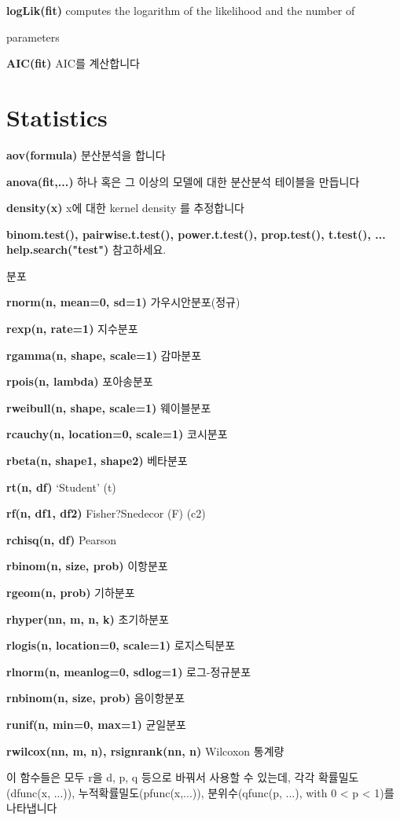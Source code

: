 \documentclass[landscape,twocolumn,letterpaper]{article}
\begin{document}
\textbf{logLik(fit)} computes the logarithm of the likelihood and the number of

parameters

\textbf{AIC(fit)} AIC를 계산합니다

\section{Statistics}

\textbf{aov(formula)} 분산분석을 합니다

\textbf{anova(fit,...) }하나 혹은 그 이상의 모델에 대한 분산분석 테이블을 만듭니다

\textbf{density(x)} x에 대한 kernel density 를 추정합니다

\textbf{binom.test(), pairwise.t.test(), power.t.test(), prop.test(),
t.test(), ... help.search("test")} 참고하세요.

분포

\textbf{rnorm(n, mean=0, sd=1)} 가우시안분포(정규)

\textbf{rexp(n, rate=1)} 지수분포

\textbf{rgamma(n, shape, scale=1)} 감마분포

\textbf{rpois(n, lambda)} 포아송분포

\textbf{rweibull(n, shape, scale=1)} 웨이블분포

\textbf{rcauchy(n, location=0, scale=1)} 코시분포

\textbf{rbeta(n, shape1, shape2)} 베타분포

\textbf{rt(n, df)} ‘Student’ (t)

\textbf{rf(n, df1, df2)} Fisher?Snedecor (F) (c2)

\textbf{rchisq(n, df)} Pearson

\textbf{rbinom(n, size, prob) }이항분포

\textbf{rgeom(n, prob) }기하분포

\textbf{rhyper(nn, m, n, k)} 초기하분포

\textbf{rlogis(n, location=0, scale=1)} 로지스틱분포

\textbf{rlnorm(n, meanlog=0, sdlog=1)} 로그-정규분포

\textbf{rnbinom(n, size, prob)} 음이항분포

\textbf{runif(n, min=0, max=1)} 균일분포

\textbf{rwilcox(nn, m, n), rsignrank(nn, n)} Wilcoxon 통계량

이 함수들은 모두 r을 d, p, q 등으로 바꿔서 사용할 수 있는데, 각각 확률밀도(dfunc(x, ...)),
누적확률밀도(pfunc(x,...)), 분위수(qfunc(p, ...), with 0 < p < 1)를 나타냅니다
\end{document}
